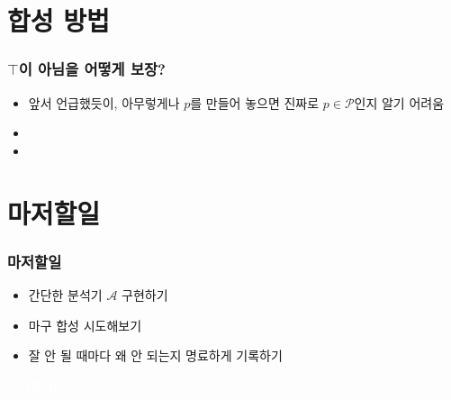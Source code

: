 \documentclass{simplesnt}
\begin{document}
\section{합성 방법}
\begin{frame}
  \frametitle{$\top$이 아님을 어떻게 보장?}
  
  \begin{itemize}
    \item 앞서 언급했듯이, 아무렇게나 $p$를 만들어 놓으면 진짜로 $p \in \mathscr{P}$인지 알기 어려움
    \vspace{0.3cm}
    \item {}
    \vspace{0.3cm}
    \item {}
  \end{itemize}

\end{frame}

\section{마저할일}
\begin{frame}
  \frametitle{마저할일}
  \begin{itemize}
    \item 간단한 분석기 $\mathcal{A}$ 구현하기
    \vspace{0.3cm}
    \item 마구 합성 시도해보기
    \vspace{0.3cm}
    \item 잘 안 될 때마다 왜 안 되는지 명료하게 기록하기
  \end{itemize}
\end{frame}


\addtocounter{framenumber}{-1} %
\appendix
\begin{frame}[c] %
  \centering
  {\Large \textcolor{white}{감사합니다}}
\end{frame}
\end{document}
